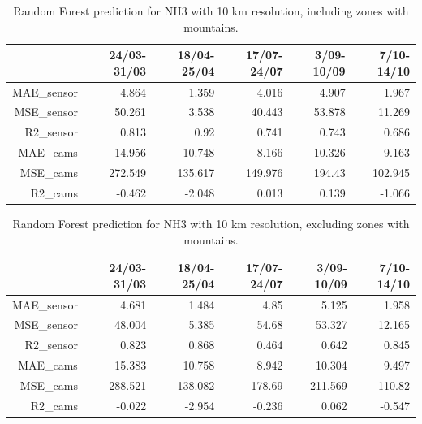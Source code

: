 \begin{table}[H]
\begin{tabular}{rrrrrr}
\hline
      &   24/03-31/03 &   18/04-25/04 &   17/07-24/07 &   3/09-10/09 &   7/10-14/10 \\
\hline
   MAE\_sensor   &            4.864 &            1.359 &            4.016 &            4.907 &            1.967 \\
   MSE\_sensor   &           50.261 &            3.538 &           40.443 &           53.878 &           11.269 \\
  R2\_sensor    &            0.813 &            0.92  &            0.741 &            0.743 &            0.686 \\
   MAE\_cams     &           14.956 &           10.748 &            8.166 &           10.326 &            9.163 \\
  MSE\_cams     &          272.549 &          135.617 &          149.976 &          194.43  &          102.945 \\
   R2\_cams      &           -0.462 &           -2.048 &            0.013 &            0.139 &           -1.066 \\
\hline
\end{tabular}
\caption{Random Forest prediction for NH3 with 10 km resolution, including zones with mountains.}
\end{table}

\begin{table}[H]
\begin{tabular}{rrrrrr}
\hline
      &   24/03-31/03 &   18/04-25/04 &   17/07-24/07 &   3/09-10/09 &   7/10-14/10 \\
\hline
   MAE\_sensor   &            4.681 &            1.484 &            4.85  &            5.125 &            1.958 \\
   MSE\_sensor   &           48.004 &            5.385 &           54.68  &           53.327 &           12.165 \\
   R2\_sensor    &            0.823 &            0.868 &            0.464 &            0.642 &            0.845 \\
   MAE\_cams     &           15.383 &           10.758 &            8.942 &           10.304 &            9.497 \\
   MSE\_cams     &          288.521 &          138.082 &          178.69  &          211.569 &          110.82  \\
   R2\_cams      &           -0.022 &           -2.954 &           -0.236 &            0.062 &           -0.547 \\
\hline
\end{tabular}
\caption{Random Forest prediction for NH3 with 10 km resolution, excluding zones with mountains.}
\end{table}

